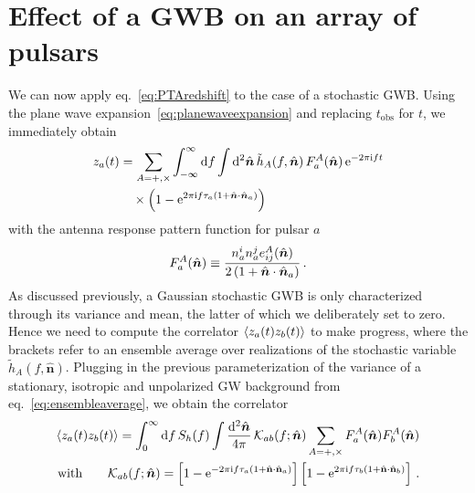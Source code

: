 \section{Effect of a GWB on an array of pulsars} \label{sec:GWBPTA}
We can now apply eq.~\eqref{eq:PTAredshift} to the case of a stochastic  \ac{GWB}. Using the plane wave expansion~\eqref{eq:planewaveexpansion} and replacing $t_\text{obs}$ for $t$, we immediately obtain 
\begin{align}
	z_a(t) &= \sum_{A= +, \times} \int_{-\infty}^{\infty} \mathop{}\!\mathrm{d} f \int \mathop{}\!\mathrm{d}^2 \hat{\bm{n}} \, \tilde{h}_A(f, \hat{\bm{n}}) \,  F_a^A(\hat{\bm{n}}) \,  \mathrm{e}^{-2 \pi \mathrm{i} f t}  \nonumber \\ & \quad \times \left( 1 - \mathrm{e}^{2 \pi \mathrm{i} f \tau_a \left( 1 + \hat{\bm{n}} \cdot \hat{\bm{n}}_a \right)} \right) \label{eq:za}
\end{align}
with the antenna response pattern function for pulsar $a$
\begin{align}
	 F_a^A(\hat{\bm{n}}) \equiv \frac{n_a^i n_a^j e_{ij}^A(\hat{\bm{n}})}{2 \left( 1 + \hat{\bm{n}} \cdot \hat{\bm{n}}_a \right)}  \, . \label{eq:ARPf}
\end{align}
As discussed previously, a Gaussian stochastic \ac{GWB} is only characterized through its variance and mean, the latter of which we deliberately set to zero. Hence we need to compute the correlator $\langle z_a(t) z_b(t) \rangle$ to make progress, where the brackets refer to an ensemble average over realizations of the stochastic variable $\tilde{h}_A(f, \hat{\bm{n}})$. Plugging  in the previous parameterization of the variance of a stationary, isotropic and unpolarized \ac{GW} background from eq.~\eqref{eq:ensembleaverage}, we obtain the correlator
\begin{align}
	\langle z_a(t) z_b(t) \rangle = \int_{0}^{\infty} \mathop{}\!\mathrm{d} f \, S_{h}(f) \int \frac{\mathop{}\!\mathrm{d}^{2} \hat{\bm{n}}}{4 \pi} \, \mathcal{K}_{a b}(f ; \hat{\bm{n}}) \sum_{A=+, \times} F_{a}^{A}(\hat{\bm{n}}) F_{b}^{A}(\hat{\bm{n}})\\
	\text{with} \qquad 
	\mathcal{K}_{a b}(f ; \hat{\bm{n}})=\left[ 1-\mathrm{e}^{-2 \pi \mathrm{i} f \tau_{a} \left( 1+\hat{\mathbf{n}} \cdot \hat{\mathbf{n}}_{a} \right)} \right] \left[ 1-\mathrm{e}^{2 \pi \mathrm{i} f \tau_{b} \left( 1+\hat{\mathbf{n}} \cdot \hat{\mathbf{n}}_{b} \right)} \right] \, .
\end{align}
